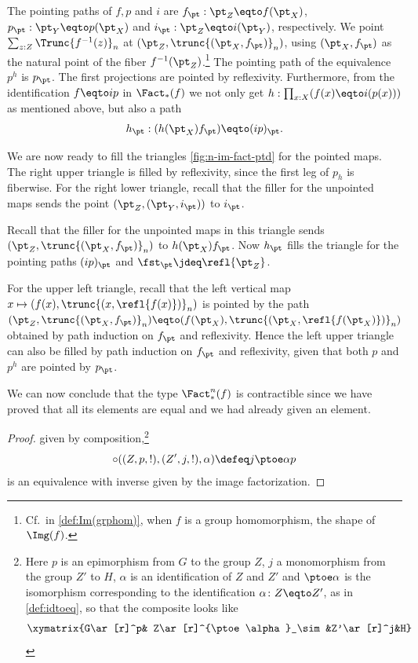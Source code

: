 \begin{remark}
The pointing paths of $f,p$ and $i$ are
$f_\pt:\pt_Z\eqto f(\pt_X)$,
$p_\pt:\pt_Y\eqto p(\pt_X)$ and
$i_\pt:\pt_Z\eqto i(\pt_Y)$, respectively.
We point $\sum_{z:Z}\Trunc{f^{-1}(z)}_n$ 
at $(\pt_Z,\trunc{(\pt_X,f_\pt)}_n)$,
using $(\pt_X,f_\pt)$ as the natural point of the 
fiber $f^{-1}(\pt_Z)$.\footnote{Cf.\ in \cref{def:Im(grphom)}, 
when $f$ is a group homomorphism, the shape of $\Img(f)$.}
The pointing path of the equivalence $p^h$ is $p_\pt$.
The first projections are pointed by reflexivity.
Furthermore, from the identification $f\eqto ip$ in $\Fact_*(f)$ we
not only get $h:\prod_{x:X}(f(x)\eqto i(p(x)))$ as mentioned above,
but also a path 
\[
h_\pt: (h(\pt_X)f_\pt)\eqto (ip)_\pt.
\]

We are now ready to fill the triangles \cref{fig:n-im-fact-ptd}
for the pointed maps.
The right upper triangle is filled by reflexivity, since
the first leg of $p_h$ is fiberwise.
For the right lower triangle, recall that the filler for the
unpointed maps sends the point $(\pt_Z,(\pt_Y,i_\pt))$ to $i_\pt$.



Recall that the filler for the unpointed maps in this triangle sends
$(\pt_Z,\trunc{(\pt_X,f_\pt)}_n)$ to $h(\pt_X)f_\pt$.
Now $h_\pt$ fills the triangle for the pointing paths $(ip)_\pt$
and $\fst_\pt\jdeq\refl{\pt_Z}$.

For the upper left triangle, recall that the left vertical 
map $x\mapsto (f(x),\trunc{(x,\refl{f(x)})}_n)$
is pointed by the path $(\pt_Z,\trunc{(\pt_X,f_\pt)}_n) \eqto 
(f(\pt_X),\trunc{(\pt_X,\refl{f(\pt_X)})}_n)$ obtained by path induction 
on $f_\pt$ and reflexivity. Hence the left upper triangle can also
be filled by path induction on $f_\pt$ and reflexivity, given that
both $p$ and $p^h$ are pointed by $p_\pt$.

We can now conclude that the type $\Fact_*^n(f)$ is contractible
since we have proved that
all its elements are equal and we had already given an element.
\end{remark}


  


\begin{proof}
    given by composition,\footnote{Here $p$ is an epimorphism from $G$ to the group $Z$, $j$ a monomorphism from the group $Z'$ to $H$, $\alpha$ is an identification of $Z$ and $Z'$
      and $\ptoe\alpha$ is the isomorphism corresponding to the identification $\alpha\colon Z\eqto Z'$, as in \cref{def:idtoeq},
      so that the composite looks like
    $$\xymatrix{G\ar[r]^p& Z\ar[r]^{\ptoe\alpha}_\sim&Z'\ar[r]^j&H}$$}
    $$\circ((Z,p,!),(Z',j,!),\alpha)\defeq j\ptoe \alpha p$$
    is an equivalence
    with inverse given by the image factorization.

\end{proof}

